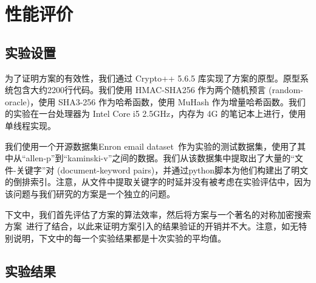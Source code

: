 \section{性能评价}



\subsection{实验设置}
为了证明方案\single 的有效性，我们通过 Crypto++ 5.6.5 库实现了方案的原型。原型系统包含大约2200行代码。我们使用 HMAC-SHA256 作为两个随机预言 (random-oracle)，使用 SHA3-256 作为哈希函数，使用 MuHash 作为增量哈希函数。我们的实验在一台处理器为 Intel Core i5 2.5GHz，内存为 4G 的笔记本上进行，使用单线程实现。

我们使用一个开源数据集Enron email dataset~\cite{enronemail}作为实验的测试数据集，使用了其中从“allen-p”到“kaminski-v”之间的数据。我们从该数据集中提取出了大量的“文件-关键字”对 (document-keyword pairs)，并通过python脚本为他们构建出了明文的倒排索引。注意，从文件中提取关键字的时延并没有被考虑在实验评估中，因为该问题与我们研究的\single 方案是一个独立的问题。

下文中，我们首先评估了\single 方案的算法效率，然后将\single 方案与一个著名的对称加密搜索方案~\cite{cash2014dynamic}进行了结合，以此来证明\single 方案引入的结果验证的开销并不大。注意，如无特别说明，下文中的每一个实验结果都是十次实验的平均值。


\subsection{实验结果}

